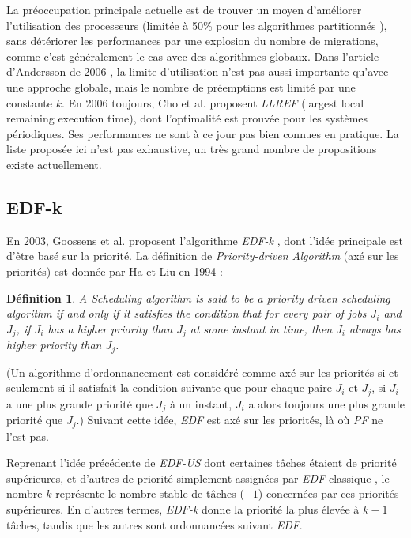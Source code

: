 \documentclass[11pt,a4paper,oneside]{report}
\newtheorem{mydef}{Définition}
\begin{document}
	La préoccupation principale actuelle est de trouver un moyen d'améliorer l'utilisation des processeurs (limitée à 
	50\% pour les algorithmes partitionnés \cite{oh_utilization_1998}), sans détériorer les performances par 
	une explosion du nombre de migrations, comme c'est généralement le cas avec des algorithmes globaux. 
	Dans l'article d'Andersson de 2006 \cite{andersson_multiprocessor_2006}, la limite d'utilisation 
	n'est pas aussi importante qu'avec une approche globale, mais le nombre de préemptions est limité par 
	une constante $k$. En 2006 toujours, Cho et al. \cite{cho_optimal_2006} proposent \textit{LLREF} 
	(largest local remaining execution time), dont l'optimalité est prouvée pour les 
	systèmes périodiques. Ses performances ne sont à ce jour pas bien connues en pratique. 
	La liste proposée ici n'est pas exhaustive, un très grand nombre de propositions existe actuellement. 
	
	\subsection{EDF-k}
	En 2003, Goossens et al. proposent l'algorithme \textit{EDF-k} \cite{goossens_priority-driven_2003}, 
	dont l'idée principale est d'être basé sur la priorité. 
	La définition de \textit{Priority-driven Algorithm} (axé sur les priorités) 
	est donnée par Ha et Liu en 1994 :
	\begin{mydef}
		A Scheduling algorithm is said to be a priority driven scheduling algorithm if and 
		only if it satisfies the condition 
		that for every pair of jobs $J_i$ and $J_j$, if $J_i$ has a higher priority than $J_j$ at 
		some instant in time, then $J_i$ always has higher priority than $J_j$.
	\end{mydef}
	(Un algorithme d'ordonnancement est considéré comme axé sur les priorités si et seulement si il 
	satisfait la condition suivante que pour chaque paire $J_i$ et $J_j$, si $J_i$ a une plus 
	grande priorité que $J_j$ à un instant, $J_i$ a alors toujours une plus grande priorité 
	que $J_j$.)\medskip
	Suivant cette idée, \textit{EDF} est axé sur les priorités, là où \textit{PF} ne l'est pas.\medskip
	
	Reprenant l'idée précédente de \textit{EDF-US} dont certaines tâches étaient de priorité 
	supérieures, et d'autres de priorité simplement assignées par \textit{EDF} \og classique\fg{} , 
	le nombre $k$ représente le nombre stable de tâches ($-1$) concernées par ces priorités 
	supérieures. En d'autres termes, \textit{EDF-k} donne la priorité la plus élevée à 
	$k - 1$ tâches, tandis que les autres sont ordonnancées suivant \textit{EDF}.\medskip
	
\end{document}
